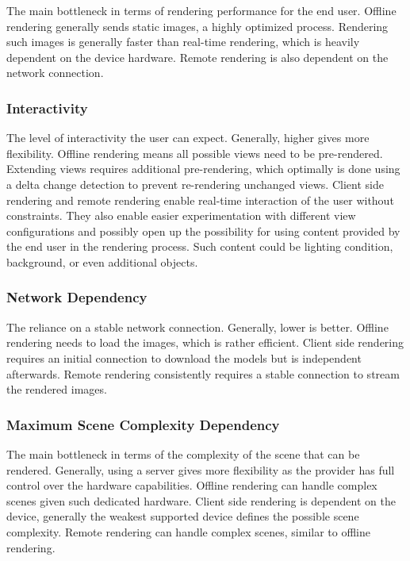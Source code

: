 The main bottleneck in terms of rendering performance for the end user. Offline rendering generally sends static images, a highly optimized process. Rendering such images is generally faster than real-time rendering, which is heavily dependent on the device hardware. Remote rendering is also dependent on the network connection.

\subsubsection{Interactivity}

The level of interactivity the user can expect. Generally, higher gives more flexibility. Offline rendering means all possible views need to be pre-rendered. Extending views requires additional pre-rendering, which optimally is done using a delta change detection to prevent re-rendering unchanged views. Client side rendering and remote rendering enable real-time interaction of the user without constraints. They also enable easier experimentation with different view configurations and possibly open up the possibility for using content provided by the end user in the rendering process. Such content could be lighting condition, background, or even additional objects.

\subsubsection{Network Dependency}

The reliance on a stable network connection. Generally, lower is better. Offline rendering needs to load the images, which is rather efficient. Client side rendering requires an initial connection to download the models but is independent afterwards. Remote rendering consistently requires a stable connection to stream the rendered images.

\subsubsection{Maximum Scene Complexity Dependency}

The main bottleneck in terms of the complexity of the scene that can be rendered. Generally, using a server gives more flexibility as the provider has full control over the hardware capabilities. Offline rendering can handle complex scenes given such dedicated hardware. Client side rendering is dependent on the device, generally the weakest supported device defines the possible scene complexity. Remote rendering can handle complex scenes, similar to offline rendering.


